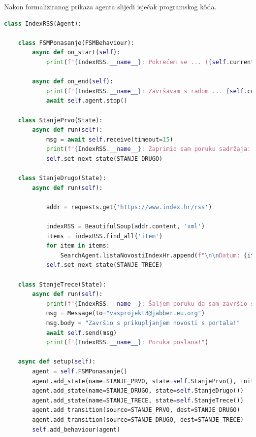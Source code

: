 \documentclass[]{foi} %
\begin{document}
Nakon formaliziranog prikaza agenta slijedi isječak programskog kôda.
\begin{lstlisting}[language=Python, caption={Programski kôd za IndexRSS agenta}]
class IndexRSS(Agent):

    class FSMPonasanje(FSMBehaviour):
        async def on_start(self):
            print(f"{IndexRSS.__name__}: Pokrećem se ... ({self.current_state})")

        async def on_end(self):
            print(f"{IndexRSS.__name__}: Završavam s radom ... {self.current_state}")
            await self.agent.stop()

    class StanjePrvo(State):
        async def run(self):
            msg = await self.receive(timeout=15)
            print(f"{IndexRSS.__name__}: Zaprimio sam poruku sadržaja: \"{msg.body}\"")
            self.set_next_state(STANJE_DRUGO)

    class StanjeDrugo(State):
        async def run(self):
            
            addr = requests.get('https://www.index.hr/rss')

            indexRSS = BeautifulSoup(addr.content, 'xml')
            items = indexRSS.find_all('item')
            for item in items:
                SearchAgent.listaNovostiIndexHr.append(f"\n\nDatum: {item.pubDate.text}.\n\nNaslov: {item.title.text}\n\nSažetak: {item.description.text}\n\nPoveznica: {item.link.text}\n\n-----------------------------------------")
            self.set_next_state(STANJE_TRECE)

    class StanjeTrece(State):
        async def run(self):
            print(f"{IndexRSS.__name__}: Šaljem poruku da sam završio s prikupljanjem novosti ...")
            msg = Message(to="vasprojekt3@jabber.eu.org")
            msg.body = "Završio s prikupljanjem novosti s portala!"
            await self.send(msg)
            print(f"{IndexRSS.__name__}: Poruka poslana!")

    async def setup(self):
        agent = self.FSMPonasanje()
        agent.add_state(name=STANJE_PRVO, state=self.StanjePrvo(), initial=True)
        agent.add_state(name=STANJE_DRUGO, state=self.StanjeDrugo())
        agent.add_state(name=STANJE_TRECE, state=self.StanjeTrece())
        agent.add_transition(source=STANJE_PRVO, dest=STANJE_DRUGO)
        agent.add_transition(source=STANJE_DRUGO, dest=STANJE_TRECE)
        self.add_behaviour(agent)
\end{lstlisting}
\end{document}

